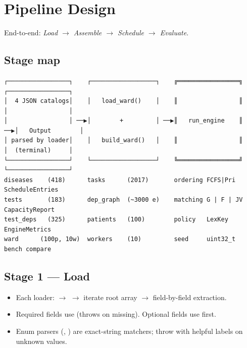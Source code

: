 \section{Pipeline Design}
\label{sec:pipeline}

\noindent
End-to-end: \emph{Load $\to$ Assemble $\to$ Schedule $\to$ Evaluate}.

\subsection{Stage map}

\begin{center}
  \begin{tcolorbox}[enhanced, breakable=false,
                    colback=boxbg, colframe=ruleblue,
                    boxrule=0.4pt, arc=2pt,
                    left=4pt, right=4pt, top=2pt, bottom=2pt]
\centering
\begin{BVerbatim}[fontsize=\scriptsize]
┌─────────────────┐    ┌──────────────────┐    ╔═════════════════╗    ┌─────────────────┐
│  4 JSON catalogs│    │   load_ward()    │    ║                 ║    │                 │
│                 │ ──▶│        +         │ ──▶║   run_engine    ║ ──▶│   Output        │
│ parsed by loader│    │   build_ward()   │    ║                 ║    │  (terminal)     │
└─────────────────┘    └──────────────────┘    ╚═════════════════╝    └─────────────────┘
diseases    (418)      tasks      (2017)       ordering FCFS|Pri      ScheduleEntries
tests       (183)      dep_graph  (~3000 e)    matching G | F | JV    CapacityReport
test_deps   (325)      patients   (100)        policy   LexKey        EngineMetrics
ward      (100p, 10w)  workers    (10)         seed     uint32_t      bench compare
\end{BVerbatim}
  \end{tcolorbox}
\end{center}

\subsection{Stage 1 --- Load}

\begin{itemize}
  \item Each loader:  $\to$
         $\to$ iterate root array
        $\to$ field-by-field extraction.
  \item Required fields use  (throws on missing).
        Optional fields use  first.
  \item Enum parsers (, )
        are exact-string matchers; throw with helpful labels on
        unknown values.
\end{itemize}

